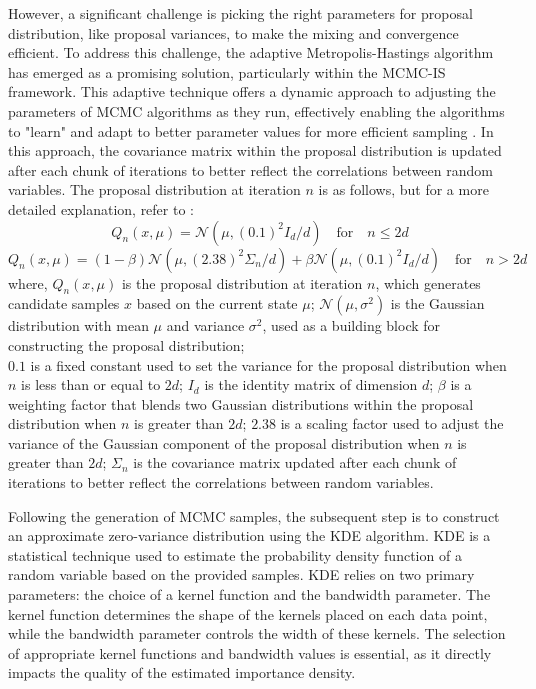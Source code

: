        However, a significant challenge is picking the right parameters for proposal distribution, like proposal variances, to make the mixing and convergence efficient. To address this challenge, the adaptive Metropolis-Hastings algorithm has emerged as a promising solution, particularly within the MCMC-IS framework. This adaptive technique offers a dynamic approach to adjusting the parameters of MCMC algorithms as they run, effectively enabling the algorithms to "learn" and adapt to better parameter values for more efficient sampling \cite{haario_adaptive_2001}. In this approach, the covariance matrix within the proposal distribution is updated after each chunk of iterations to better reflect the correlations between random variables. The proposal distribution at iteration $n$ is as follows, but for a more detailed explanation, refer to \cite{haario_adaptive_2001}:
        $$Q_n(x, \mu)=\mathcal{N}(\mu,{(0.1)}^2I_d/d)\quad \text{for} \quad n\le2d$$
        $$Q_n(x, \mu)=(1-\beta)\mathcal{N}(\mu,{(2.38)}^2\Sigma_n/d) + \beta\mathcal{N}(\mu,{(0.1)}^2I_d/d)\quad \text{for} \quad n>2d$$
        where,
        $Q_n(x, \mu)$ is the proposal distribution at iteration $n$, which generates candidate samples $x$ based on the current state $\mu$;
        $\mathcal{N}(\mu, \sigma^2)$ is the Gaussian distribution with mean $\mu$ and variance $\sigma^2$, used as a building block for constructing the proposal distribution;\\
        $0.1$ is a fixed constant used to set the variance for the proposal distribution when $n$ is less than or equal to $2d$;
        $I_d$ is the identity matrix of dimension $d$;       
        $\beta$ is a weighting factor that blends two Gaussian distributions within the proposal distribution when $n$ is greater than $2d$;      
        $2.38$ is a scaling factor used to adjust the variance of the Gaussian component of the proposal distribution when $n$ is greater than $2d$;        
        $\Sigma_n$ is the covariance matrix updated after each chunk of iterations to better reflect the correlations between random variables.        
        
        Following the generation of MCMC samples, the subsequent step is to construct an approximate zero-variance distribution using the KDE algorithm. KDE is a statistical technique used to estimate the probability density function of a random variable based on the provided samples. KDE relies on two primary parameters: the choice of a kernel function and the bandwidth parameter. The kernel function determines the shape of the kernels placed on each data point, while the bandwidth parameter controls the width of these kernels. The selection of appropriate kernel functions and bandwidth values is essential, as it directly impacts the quality of the estimated importance density.
   
